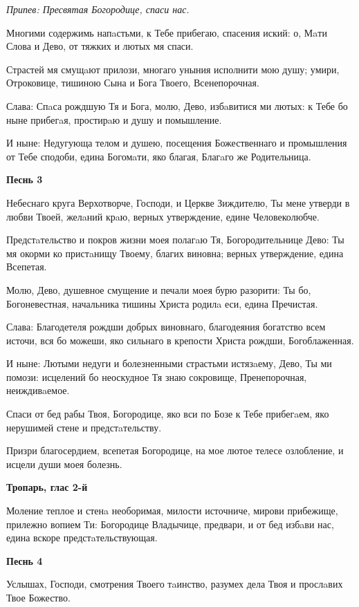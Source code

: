 \itshape Припев:\normalfont{} Пресвятая Богородице, спаси нас.


Многими содержимь напaстьми, к Тебе прибегаю, спасения иский: о, Мaти Слова и Дево, от тяжких и лютых мя спаси.


Страстей мя смущaют прилози, многаго уныния исполнити мою душу; умири, Отроковице, тишиною Сына и Бога Твоего, Всенепорочная.


Слава: Спaса рождшую Тя и Бога, молю, Дево, избaвитися ми лютых: к Тебе бо ныне прибегaя, простирaю и душу и помышление.


И ныне: Недугующа телом и душею, посещения Божественнаго и промышления от Тебе сподоби, едина Богомaти, яко благая, Благaго же Родительница.


\medskip
\bfseries Песнь 3\normalfont{}\nopagebreak


Небеснаго круга Верхотворче, Господи, и Церкве Зиждителю, Ты мене утверди в любви Твоей, желaний крaю, верных утверждение, едине Человеколюбче.

Предстaтельство и покров жизни моея полагaю Тя, Богородительнице Дево: Ты мя окорми ко пристaнищу Твоему, благих виновна; верных утверждение, едина Всепетая.


Молю, Дево, душевное смущение и печали моея бурю разорити: Ты бо, Богоневестная, начальника тишины Христа родилa еси, едина Пречистая.


Слава: Благодетеля рождши добрых виновнаго, благодеяния богатство всем источи, вся бо можеши, яко сильнаго в крепости Христа рождши, Богоблаженная.


И ныне: Лютыми недуги и болезненными страстьми истязaему, Дево, Ты ми помози: исцелений бо неоскудное Тя знаю сокровище, Пренепорочная, неиждивaемое.


Спаси от бед рабы Твоя, Богородице, яко вси по Бозе к Тебе прибегaем, яко нерушимей стене и предстaтельству.


Призри благосердием, всепетая Богородице, на мое лютое телесе озлобление, и исцели души моея болезнь.


\medskip
\bfseries Тропарь, глас 2-й\normalfont{}\nopagebreak


Моление теплое и стенa необоримая, милости источниче, мирови прибежище, прилежно вопием Ти: Богородице Владычице, предвари, и от бед избaви нас, едина вскоре предстaтельствующая.


\medskip
\bfseries Песнь 4\normalfont{}\nopagebreak


Услышах, Господи, смотрения Твоего тaинство, разумех дела Твоя и прослaвих Твое Божество.

